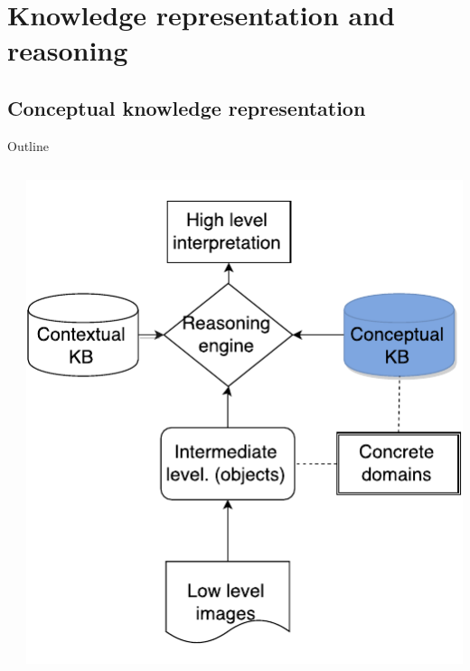 \documentclass{beamer}
\begin{document}
\section{Knowledge representation and reasoning}
\subsection{Conceptual knowledge representation}

\begin{frame}{Outline}
\begin{columns}
 \begin{column}{0.6\textwidth}
  \tableofcontents[currentsection,hideothersubsections,subsectionstyle=show/shaded]
 \end{column}

 \begin{column}{.4\textwidth}
  \includegraphics[width=.9\textwidth]{images/flowchart_kb_crop.pdf}
 \end{column}
\end{columns}
\end{frame}
\end{document}
